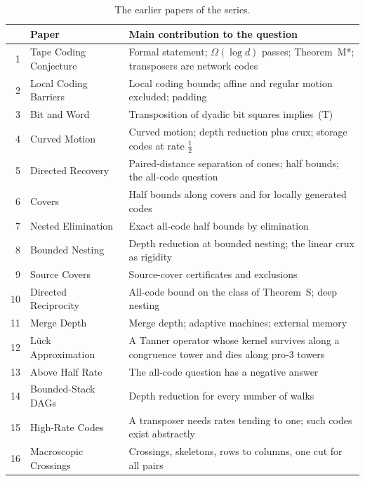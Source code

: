 \begin{table}[t]
\centering\small
\begin{tabular}{@{}r>{\raggedright\arraybackslash}p{}>{\raggedright\arraybackslash}p{}@{}}
\toprule
 & Paper & Main contribution to the question \\
\midrule
1 & Tape Coding Conjecture~\cite{FirstPaper2026} & Formal statement; $\Omega(\log d)$ passes; Theorem~M*; transposers
are network codes \\
2 & Local Coding Barriers~\cite{SecondPaper2026} & Local coding bounds; affine and regular motion excluded; padding \\
3 & Bit and Word~\cite{ThirdPaper2026} & Transposition of dyadic bit squares implies~(T) \\
4 & Curved Motion~\cite{FourthPaper2026} & Curved motion; depth reduction plus crux; storage codes at rate $\tfrac12$ \\
5 & Directed Recovery~\cite{DirectedRecovery2026} & Paired-distance separation of cones; half bounds; the all-code
question \\
6 & Covers~\cite{Covers2026} & Half bounds along covers and for locally generated codes \\
7 & Nested Elimination~\cite{SeventhPaper2026} & Exact all-code half bounds by elimination \\
8 & Bounded Nesting~\cite{EighthPaper2026} & Depth reduction at bounded nesting; the linear crux as rigidity \\
9 & Source Covers~\cite{SourceCovers2026} & Source-cover certificates and exclusions \\
10 & Directed Reciprocity~\cite{DirectedReciprocity2026} & All-code bound on the class of Theorem~S; deep nesting \\
11 & Merge Depth~\cite{MergeDepth2026} & Merge depth; adaptive machines; external memory \\
12 & L\"uck Approximation~\cite{Luck2026} & A Tanner operator whose kernel survives along a congruence tower and dies
along pro-$3$ towers \\
13 & Above Half Rate~\cite{StorageCodes2026} & The all-code question has a negative answer \\
14 & Bounded-Stack DAGs~\cite{BoundedStack2026} & Depth reduction for every number of walks \\
15 & High-Rate Codes~\cite{HighRate2026} & A transposer needs rates tending to one; such codes exist abstractly \\
16 & Macroscopic Crossings~\cite{SixteenthPaper2026} & Crossings, skeletons, rows to columns, one cut for all pairs \\
\bottomrule
\end{tabular}
\caption{The earlier papers of the series.}\label{tab:series}
\end{table}
